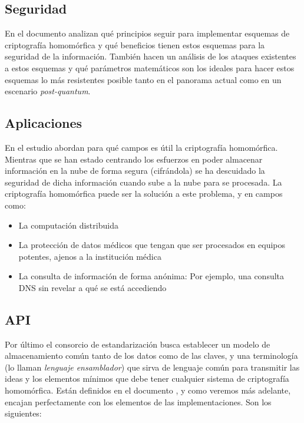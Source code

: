 \subsection{Seguridad}

En el documento \cite{chase_security_2017} analizan qué principios seguir para implementar esquemas de criptografía homomórfica y qué beneficios tienen estos esquemas para la seguridad de la información. También hacen un análisis de los ataques existentes a estos esquemas y qué parámetros matemáticos son los ideales para hacer estos esquemas lo más resistentes posible tanto en el panorama actual como en un escenario \textit{post-quantum}.

\subsection{Aplicaciones}

En el estudio \cite{archer_applications_2017} abordan para qué campos es útil la criptografía homomórfica. Mientras que se han estado centrando los esfuerzos en poder almacenar información en la nube de forma segura (cifrándola) se ha descuidado la seguridad de dicha información cuando sube a la nube para se procesada. La criptografía homomórfica puede ser la solución a este problema, y en campos como:

\begin{itemize}
    \item La computación distribuida
    \item La protección de datos médicos que tengan que ser procesados en equipos potentes, ajenos a la institución médica
    \item La consulta de información de forma anónima: Por ejemplo, una consulta DNS sin revelar a qué se está accediendo
\end{itemize}

\subsection{API}

Por último el consorcio de estandarización busca establecer un modelo de almacenamiento común tanto de los datos como de las claves, y una terminología (lo llaman \textit{lenguaje ensamblador}) que sirva de lenguaje común para transmitir las ideas y los elementos mínimos que debe tener cualquier sistema de criptografía homomórfica. Están definidos en el documento \cite{brenner_standard_2017}, y como veremos más adelante, encajan perfectamente con los elementos de las implementaciones. Son los siguientes:

